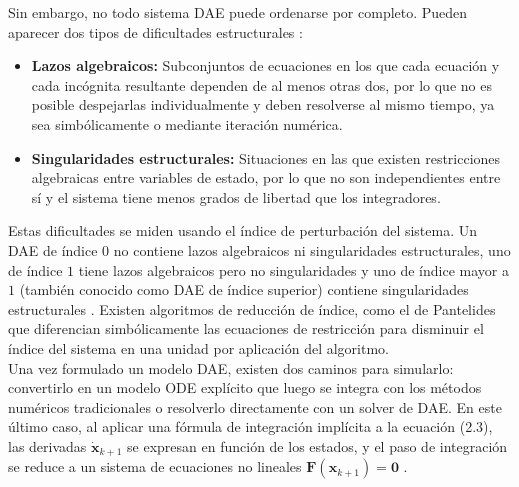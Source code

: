 Sin embargo, no todo sistema DAE puede ordenarse por completo. Pueden aparecer dos tipos de dificultades estructurales \cite{cellier2006}:

\begin{itemize}

	
	\item \textbf{Lazos algebraicos:} Subconjuntos de ecuaciones en los que cada ecuación y cada incógnita resultante dependen de al menos otras dos, por lo que no es posible despejarlas individualmente y deben resolverse al mismo tiempo, ya sea simbólicamente o mediante iteración numérica.
	
	\item \textbf{Singularidades estructurales:} Situaciones en las que existen restricciones algebraicas entre variables de estado, por lo que no son independientes entre sí y el sistema tiene menos grados de libertad que los integradores.
\end{itemize}

Estas dificultades se miden usando el índice de perturbación del sistema. Un DAE de índice $0$ no contiene lazos algebraicos ni singularidades estructurales, uno de índice $1$ tiene lazos algebraicos pero no singularidades y uno de índice mayor a $1$ (también conocido como DAE de índice superior) contiene singularidades estructurales  \cite{cellier2006}. Existen algoritmos de reducción de índice, como el de Pantelides que diferencian simbólicamente las ecuaciones de restricción para disminuir el índice del sistema en una unidad por aplicación del algoritmo. \\

Una vez formulado un modelo DAE, existen dos caminos para simularlo: convertirlo en un modelo ODE explícito que luego se integra con los métodos numéricos tradicionales o resolverlo directamente con un solver de DAE. En este último caso, al aplicar una fórmula de integración implícita a la ecuación (2.3), las derivadas $\dot{\mathbf{x}}_{k+1}$ se expresan en función de los estados, y el paso de integración se reduce a un sistema de ecuaciones no lineales $\mathbf{F}(\mathbf{x}_{k+1}) = \mathbf{0}$ \cite{cellier2006}. \\


